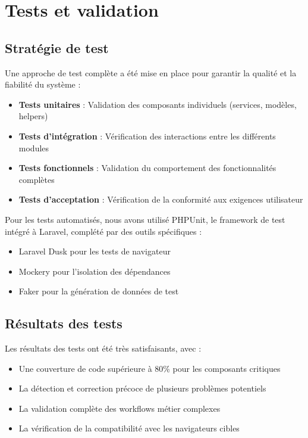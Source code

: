 \section{Tests et validation}

\subsection{Stratégie de test}
Une approche de test complète a été mise en place pour garantir la qualité et la fiabilité du système :

\begin{itemize}
    \item \textbf{Tests unitaires} : Validation des composants individuels (services, modèles, helpers)
    \item \textbf{Tests d'intégration} : Vérification des interactions entre les différents modules
    \item \textbf{Tests fonctionnels} : Validation du comportement des fonctionnalités complètes
    \item \textbf{Tests d'acceptation} : Vérification de la conformité aux exigences utilisateur
\end{itemize}

Pour les tests automatisés, nous avons utilisé PHPUnit, le framework de test intégré à Laravel, complété par des outils spécifiques :

\begin{itemize}
    \item Laravel Dusk pour les tests de navigateur
    \item Mockery pour l'isolation des dépendances
    \item Faker pour la génération de données de test
\end{itemize}

\subsection{Résultats des tests}
Les résultats des tests ont été très satisfaisants, avec :

\begin{itemize}
    \item Une couverture de code supérieure à 80\% pour les composants critiques
    \item La détection et correction précoce de plusieurs problèmes potentiels
    \item La validation complète des workflows métier complexes
    \item La vérification de la compatibilité avec les navigateurs cibles
\end{itemize}

